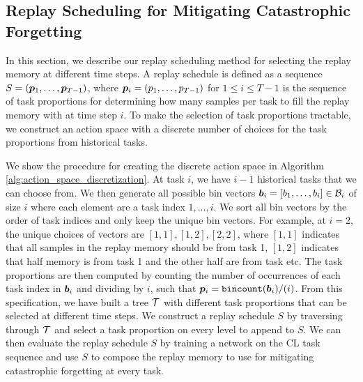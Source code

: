 \subsection{Replay Scheduling for Mitigating Catastrophic Forgetting}

In this section, we describe our replay scheduling method for selecting the replay memory at different time steps. A replay schedule is defined as a sequence $S = ({\bm{p}}_1, \dots, {\bm{p}}_{T-1})$, where ${\bm{p}}_i = (p_1, \dots, p_{T-1})$ for $1 \leq i \leq T-1$ is the sequence of task proportions for determining how many samples per task to fill the replay memory with at time step $i$. To make the selection of task proportions tractable, we construct an action space with a discrete number of choices for the task proportions from historical tasks. 

We show the procedure for creating the discrete action space in Algorithm \ref{alg:action_space_discretization}. At task $i$, we have $i-1$ historical tasks that we can choose from. We then generate all possible bin vectors ${\bm{b}}_i = [b_1, \dots, b_{i}] \in {\mathcal{B}}_i$ of size $i$ where each element are a task index $1, ..., i$. We sort all bin vectors by the order of task indices and only keep the unique bin vectors. For example, at $i=2$, the unique choices of vectors are $[1,1], [1,2], [2,2]$, where $[1,1]$ indicates that all samples in the replay memory should be from task 1, $[1,2]$ indicates that half memory is from task 1 and the other half are from task etc. The task proportions are then computed by counting the number of occurrences of each task index in ${\bm{b}}_i$ and dividing by $i$, such that ${\bm{p}}_i = \texttt{bincount}({\bm{b}}_i) / (i)$. From this specification, we have built a tree ${\mathcal{T}}$ with different task proportions that can be selected at different time steps. We construct a replay schedule $S$ by traversing through ${\mathcal{T}}$ and select a task proportion on every level to append to $S$. We can then evaluate the replay schedule $S$ by training a network on the CL task sequence and use $S$ to compose the replay memory to use for mitigating catastrophic forgetting at every task. %


